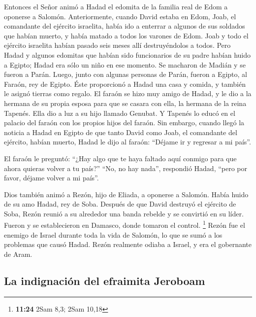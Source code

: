  Entonces el Señor animó a Hadad el edomita de la familia
real de Edom a oponerse a Salomón.  Anteriormente, cuando
David estaba en Edom, Joab, el comandante del ejército israelita, había
ido a enterrar a algunos de sus soldados que habían muerto, y había
matado a todos los varones de Edom.  Joab y todo el
ejército israelita habían pasado seis meses allí destruyéndolos a todos.
 Pero Hadad y algunos edomitas que habían sido
funcionarios de su padre habían huido a Egipto; Hadad era sólo un niño
en ese momento.  Se macharon de Madián y se fueron a
Parán. Luego, junto con algunas personas de Parán, fueron a Egipto, al
Faraón, rey de Egipto. Éste proporcionó a Hadad una casa y comida, y
también le asignó tierras como regalo.  El faraón se hizo
muy amigo de Hadad, y le dio a la hermana de su propia esposa para que
se casara con ella, la hermana de la reina Tapenés.  Ella
dio a luz a su hijo llamado Genubat. Y Tapenés lo educó en el palacio
del faraón con los propios hijos del faraón.  Sin
embargo, cuando llegó la noticia a Hadad en Egipto de que tanto David
como Joab, el comandante del ejército, habían muerto, Hadad le dijo al
faraón: ``Déjame ir y regresar a mi país''.

 El faraón le preguntó: ``¿Hay algo que te haya faltado
aquí conmigo para que ahora quieras volver a tu país?'' ``No, no hay
nada'', respondió Hadad, ``pero por favor, déjame volver a mi país''.

 Dios también animó a Rezón, hijo de Eliada, a oponerse a
Salomón. Había huido de su amo Hadad, rey de Soba. Después de que David
destruyó el ejército de Soba,  Rezón reunió a su
alrededor una banda rebelde y se convirtió en su líder. Fueron y se
establecieron en Damasco, donde tomaron el control. \footnote{\textbf{11:24}
  2Sam 8,3; 2Sam 10,18}  Rezón fue el enemigo de Israel
durante toda la vida de Salomón, lo que se sumó a los problemas que
causó Hadad. Rezón realmente odiaba a Israel, y era el gobernante de
Aram.

\hypertarget{la-indignaciuxf3n-del-efraimita-jeroboam}{%
\subsection{La indignación del efraimita
Jeroboam}\label{la-indignaciuxf3n-del-efraimita-jeroboam}}

